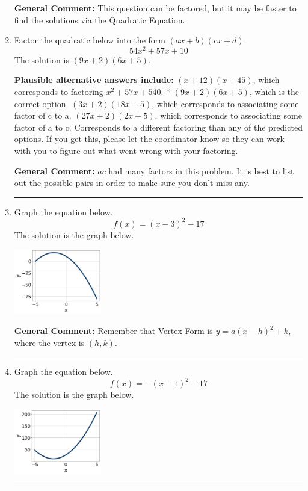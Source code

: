 \documentclass{extbook}[14pt]
\newcommand{\litem}[1]{\item #1

\rule{\textwidth}{0.4pt}}
\begin{document}
\begin{enumerate}
{\textbf{General Comment:} This question can be factored, but it may be faster to find the solutions via the Quadratic Equation.
}
\litem{
Factor the quadratic below into the form $(ax+b)(cx+d)$.
\[ 54x^{2} +57 x + 10 \]The solution is \( (9x + 2)(6x + 5) \).\begin{enumerate}[label=\Alph*.]
\textbf{Plausible alternative answers include:} $(x + 12)(x + 45)$, which corresponds to factoring $x^{2} +57 x + 540$.
* $(9x + 2)(6x + 5)$, which is the correct option.
 $(3x + 2)(18x + 5)$, which corresponds to associating some factor of c to a.
 $(27x + 2)(2x + 5)$, which corresponds to associating some factor of a to c.
 Corresponds to a different factoring than any of the predicted options. If you get this, please let the coordinator know so they can work with you to figure out what went wrong with your factoring.
\end{enumerate}

\textbf{General Comment:} $ac$ had many factors in this problem. It is best to list out the possible pairs in order to make sure you don't miss any.
}
\litem{
Graph the equation below.
\[ f(x) = (x-3)^2 - 17 \]The solution is the graph below.
    \begin{center}
        \includegraphics[width=0.3\textwidth]{../Figures/quadraticEquationToGraphCopyDC.png}
    \end{center}

\textbf{General Comment:} Remember that Vertex Form is $y = a(x-h)^2+k$, where the vertex is $(h, k)$.
}
\litem{
Graph the equation below.
\[ f(x) = -(x-1)^2 - 17 \]The solution is the graph below.
    \begin{center}
        \includegraphics[width=0.3\textwidth]{../Figures/quadraticEquationToGraphBC.png}
    \end{center}

}
\end{enumerate}
\end{document}
